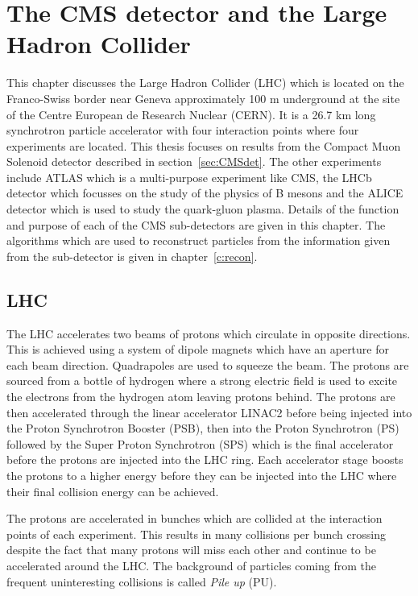 \chapter{The CMS detector and the Large Hadron Collider}
\label{c:det}
This chapter discusses the Large Hadron Collider (LHC) which is located on the Franco-Swiss border near Geneva approximately 100 m underground at the site of the Centre European de Research Nuclear (CERN). It is a 26.7 km long synchrotron particle accelerator with four interaction points where four experiments are located.  This thesis focuses on results from the Compact Muon Solenoid detector described in section~\ref{sec:CMSdet}. The other experiments include ATLAS which is a multi-purpose experiment like CMS, the LHCb detector which focusses on the study of the physics of B mesons and the ALICE detector which is used to study the quark-gluon plasma. Details of the function and purpose of each of the CMS sub-detectors are given in this chapter. The algorithms which are used to reconstruct particles from the information given from the sub-detector is given in chapter~\ref{c:recon}.

\section{LHC}

The LHC accelerates two beams of protons which circulate in opposite directions.
This is achieved using a system of dipole magnets which have an aperture for each beam direction. Quadrapoles are used to squeeze the beam.
The protons are sourced from a bottle of hydrogen where a strong electric field is used to excite the electrons from the hydrogen atom leaving protons behind. The protons are then accelerated through the linear accelerator LINAC2 before being injected into the Proton Synchrotron Booster (PSB), then into the Proton Synchrotron (PS) followed by the Super Proton Synchrotron (SPS) which is the final accelerator before the protons are injected into the LHC ring. Each accelerator stage boosts the protons to a higher energy before they can be injected into the LHC where their final collision energy can be achieved.


The protons are accelerated in bunches which are collided at the interaction points of each experiment. This results in many collisions per bunch crossing despite the fact that many protons will miss each other and continue to be accelerated around the LHC. The background of particles coming from the frequent uninteresting collisions is called \emph{Pile up} (PU).

